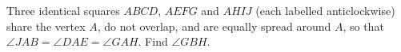 Three identical squares $ABCD$, $AEFG$ and $AHIJ$ (each labelled anticlockwise) share the vertex $A$, do not overlap, and are equally spread around $A$, so that $\angle JAB=\angle DAE=\angle GAH$. Find $\angle GBH$.
